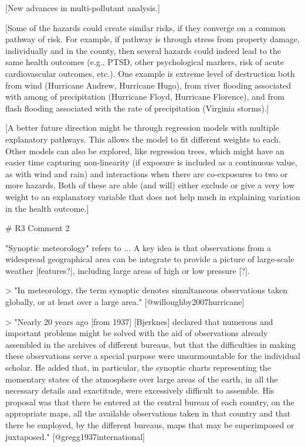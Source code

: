 [New advances in multi-pollutant analysis.]

[Some of the hazards could create similar risks, if they converge on a common
pathway of risk. For example, if pathway is through stress from property damage,
individually and in the county, then several hazards could indeed lead to the
same health outcomes (e.g., PTSD, other psychological markers, risk of acute
cardiovascular outcomes, etc.). One example is extreme level of destruction both
from wind (Hurricane Andrew, Hurricane Hugo), from river flooding associated
with among of precipitation (Hurricane Floyd, Hurricane Florence), and from
flash flooding associated with the rate of precipitation (Virginia storms).]

[A better future direction might be through regression models with multiple
explanatory pathways. This allows the model to fit different weights to each.
Other models can also be explored, like regression trees, which might have an
easier time capturing non-linearity (if exposure is included as a continuous
value, as with wind and rain) and interactions when there are co-exposures to
two or more hazards. Both of these are able (and will) either exclude or give a
very low weight to an explanatory variable that does not help much in explaining
variation in the health outcome.]


# R3 Comment 2

"Synoptic meteorology" refers to ...
A key idea is that observations from a widespread geographical area can be
integrate to provide a picture of large-scale weather [features?], including
large areas of high or low pressure [?].

> "In meteorology, the term synoptic denotes simultaneous observations taken
globally, or at least over a large area." [@willoughby2007hurricane]

> "Nearly 20 years ago [from 1937] [Bjerknes] declared that numerous and 
important problems might be solved with the aid of observations already 
assembled in the archives of different bureaus, but that the difficulties
in making these observations serve a special purpose were unsurmountable
for the individual scholar. He added that, in particular, the synoptic 
charts representing the momentary states of the atmosphere over large
areas of the earth, in all the necessary details and exactitude, were 
excessively difficult to assemble. His proposal was that there be entered
at the central bureau of each country, on the appropriate maps, all the available
observations taken in that country and that there be employed, by the different
bureaus, maps that may be superimposed or juxtaposed." [@gregg1937international]

